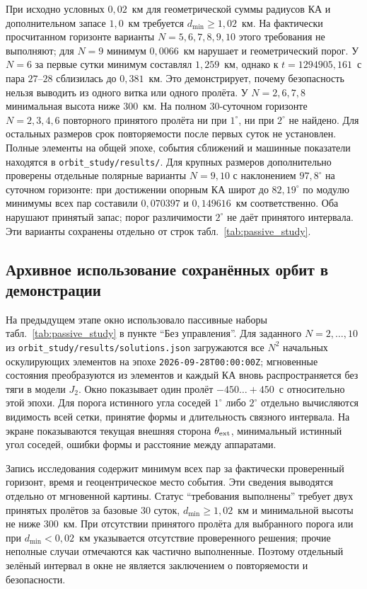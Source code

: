 \documentclass[a4paper,12pt]{article}
\begin{document}
При исходно условных $0{,}02$~км для геометрической суммы
радиусов КА и дополнительном запасе $1{,}0$~км требуется
$d_{\min}\geq1{,}02$~км. На фактически просчитанном горизонте
варианты $N=5,6,7,8,9,10$ этого требования не выполняют;
для $N=9$ минимум $0{,}0066$~км нарушает и геометрический
порог. У $N=6$ за первые сутки минимум составлял
$1{,}259$~км, однако к $t=1294905{,}161$~с пара
$27$--$28$ сблизилась до $0{,}381$~км. Это демонстрирует,
почему безопасность нельзя выводить из одного витка или
одного пролёта. У $N=2,6,7,8$ минимальная высота ниже
$300$~км. На полном 30-суточном горизонте $N=2,3,4,6$
повторного принятого пролёта ни при $1^\circ$, ни при
$2^\circ$ не найдено. Для остальных размеров срок
повторяемости после первых суток не установлен. Полные
элементы на общей эпохе, события сближений и машинные
показатели находятся в \texttt{orbit\_study/results/}.
Для крупных размеров дополнительно проверены отдельные
полярные варианты $N=9,10$ с наклонением $97{,}8^\circ$ на
суточном горизонте: при достижении опорным КА широт до
$82{,}19^\circ$ по модулю минимумы всех пар составили
$0{,}070397$ и $0{,}149616$~км соответственно. Оба
нарушают принятый запас; порог различимости $2^\circ$
не даёт принятого интервала. Эти варианты сохранены
отдельно от строк табл.~\ref{tab:passive_study}.

\subsection{Архивное использование сохранённых орбит в демонстрации}

На предыдущем этапе окно использовало пассивные наборы
табл.~\ref{tab:passive_study} в пункте ``Без управления''. Для заданного $N=2,\ldots,10$ из
\texttt{orbit\_study/results/solutions.json} загружаются все $N^2$
начальных оскулирующих элементов на эпохе
\texttt{2026-09-28T00:00:00Z}; мгновенные состояния преобразуются
из элементов и каждый КА вновь распространяется без тяги в модели
$J_2$. Окно показывает один пролёт $-450\ldots+450$~с относительно
этой эпохи. Для порога истинного угла соседей $1^\circ$ либо
$2^\circ$ отдельно вычисляются видимость всей сетки, принятие
формы и длительность связного интервала. На экране показываются
текущая внешняя сторона $\theta_{\rm ext}$, минимальный истинный
угол соседей, ошибки формы и расстояние между аппаратами.

Запись исследования содержит минимум всех пар за фактически
проверенный горизонт, время и геоцентрическое место события. Эти
сведения выводятся отдельно от мгновенной картины. Статус
``требования выполнены'' требует двух принятых пролётов за базовые
$30$ суток, $d_{\min}\geq1{,}02$~км и минимальной высоты
не ниже $300$~км. При отсутствии принятого пролёта для выбранного
порога или при $d_{\min}<0{,}02$~км указывается отсутствие
проверенного решения; прочие неполные случаи отмечаются как
частично выполненные. Поэтому отдельный зелёный интервал в окне
не является заключением о повторяемости и безопасности.
\end{document}
